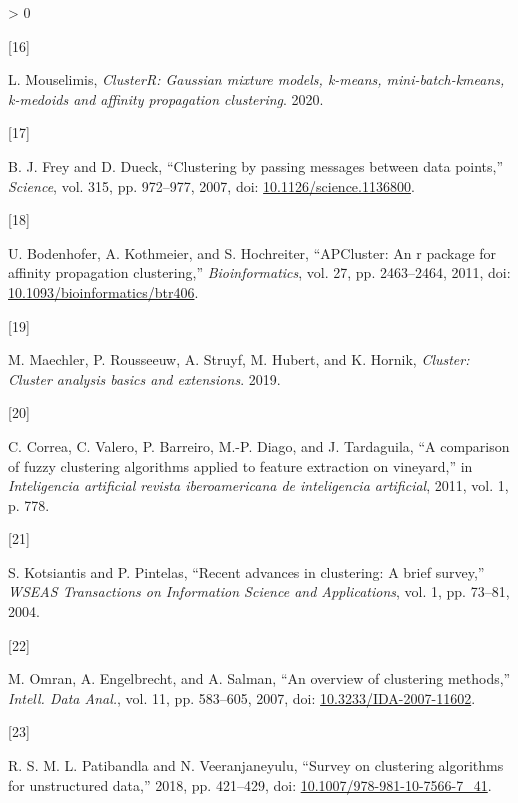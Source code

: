 \documentclass[
]{article}
\newlength{\cslhangindent}
\newlength{\csllabelwidth}
\newenvironment{CSLReferences}[3] %
 {%
  \setlength{\parindent}{0pt}
  \ifodd #1 \everypar{\setlength{\hangindent}{\cslhangindent}}\ignorespaces\fi
  \ifnum #2 > 0
  \setlength{\parskip}{#2\baselineskip}
  \fi
 }%
 {}
\newcommand{\CSLLeftMargin}[1]{\parbox[t]{\csllabelwidth}{#1}}
\newcommand{\CSLRightInline}[1]{\parbox[t]{\linewidth - \csllabelwidth}{#1}}
\begin{document}
\begin{CSLReferences}{0}{0}
\leavevmode\hypertarget{ref-Rmouselimis2020}{}%
\CSLLeftMargin{{[}16{]} }
\CSLRightInline{L. Mouselimis, \emph{ClusterR: Gaussian mixture models,
k-means, mini-batch-kmeans, k-medoids and affinity propagation
clustering}. 2020.}

\leavevmode\hypertarget{ref-Rfreydueck2007}{}%
\CSLLeftMargin{{[}17{]} }
\CSLRightInline{B. J. Frey and D. Dueck, {``Clustering by passing
messages between data points,''} \emph{Science}, vol. 315, pp. 972--977,
2007, doi:
\href{https://doi.org/10.1126/science.1136800}{10.1126/science.1136800}.}

\leavevmode\hypertarget{ref-Rbodenhoferkothmeierhochreiter2011}{}%
\CSLLeftMargin{{[}18{]} }
\CSLRightInline{U. Bodenhofer, A. Kothmeier, and S. Hochreiter,
{``APCluster: An r package for affinity propagation clustering,''}
\emph{Bioinformatics}, vol. 27, pp. 2463--2464, 2011, doi:
\href{https://doi.org/10.1093/bioinformatics/btr406}{10.1093/bioinformatics/btr406}.}

\leavevmode\hypertarget{ref-Rmaechlerrousseeuwhuberthornik2019}{}%
\CSLLeftMargin{{[}19{]} }
\CSLRightInline{M. Maechler, P. Rousseeuw, A. Struyf, M. Hubert, and K.
Hornik, \emph{Cluster: Cluster analysis basics and extensions}. 2019.}

\leavevmode\hypertarget{ref-Rfariasubiernaelorzasantamarialaso2011}{}%
\CSLLeftMargin{{[}20{]} }
\CSLRightInline{C. Correa, C. Valero, P. Barreiro, M.-P. Diago, and J.
Tardaguila, {``A comparison of fuzzy clustering algorithms applied to
feature extraction on vineyard,''} in \emph{Inteligencia artificial
revista iberoamericana de inteligencia artificial}, 2011, vol. 1, p.
778.}

\leavevmode\hypertarget{ref-Rsotirisp2004}{}%
\CSLLeftMargin{{[}21{]} }
\CSLRightInline{S. Kotsiantis and P. Pintelas, {``Recent advances in
clustering: A brief survey,''} \emph{WSEAS Transactions on Information
Science and Applications}, vol. 1, pp. 73--81, 2004.}

\leavevmode\hypertarget{ref-Rmahamedandriesayed2007}{}%
\CSLLeftMargin{{[}22{]} }
\CSLRightInline{M. Omran, A. Engelbrecht, and A. Salman, {``An overview
of clustering methods,''} \emph{Intell. Data Anal.}, vol. 11, pp.
583--605, 2007, doi:
\href{https://doi.org/10.3233/IDA-2007-11602}{10.3233/IDA-2007-11602}.}

\leavevmode\hypertarget{ref-Rpatibandlalakshmiveeranjaneyulu2018}{}%
\CSLLeftMargin{{[}23{]} }
\CSLRightInline{R. S. M. L. Patibandla and N. Veeranjaneyulu, {``Survey
on clustering algorithms for unstructured data,''} 2018, pp. 421--429,
doi:
\href{https://doi.org/10.1007/978-981-10-7566-7_41}{10.1007/978-981-10-7566-7\_41}.}


\end{CSLReferences}
\end{document}
